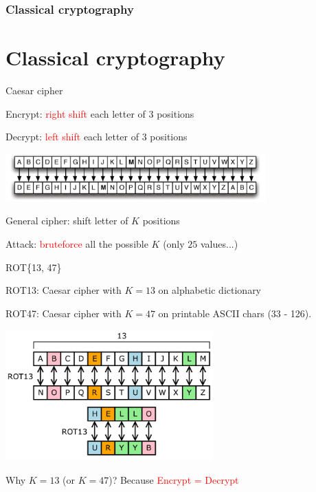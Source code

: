 \section[Section]{Classical cryptography}
\part{Classical cryptography}

\begin{frame}{Caesar cipher}

\centering

\smallskip

Encrypt: \textcolor{red}{right shift} each letter of 3 positions

\smallskip

Decrypt: \textcolor{red}{left shift} each letter of 3 positions

\medskip

\includegraphics[width=10cm]{img/caesar-shift.png}

\medskip

General cipher: shift letter of $K$ positions

\smallskip

Attack: \textcolor{red}{bruteforce} all the possible $K$ (only $25$ values...)

\end{frame}

\begin{frame}{ROT\{13, 47\}}

\centering

\medskip

ROT13: Caesar cipher with $K = 13$ on alphabetic dictionary

ROT47: Caesar cipher with $K = 47$ on printable ASCII chars (33 - 126).

\medskip

\includegraphics[width=8cm]{img/ROT13.png}

\medskip

Why $K = 13$ (or $K = 47$)? Because \textcolor{red}{Encrypt = Decrypt}

\end{frame}


